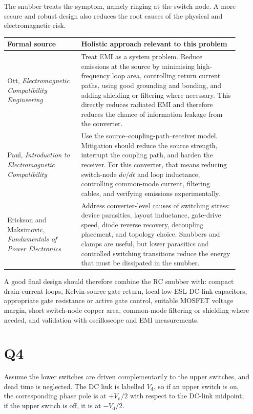 \documentclass[11pt,a4paper]{article}
\newcommand{\Vd}{V_{\mathrm d}}
\begin{document}
The snubber treats the symptom, namely ringing at the switch node. A more secure and robust design also reduces the root causes of the physical and electromagnetic risk.

\begin{longtable}{@{}p{0.30\linewidth}p{0.64\linewidth}@{}}
\toprule
Formal source & Holistic approach relevant to this problem \\
\midrule
Ott, \emph{Electromagnetic Compatibility Engineering} \cite{ott} & Treat EMI as a system problem. Reduce emissions at the source by minimising high-frequency loop area, controlling return current paths, using good grounding and bonding, and adding shielding or filtering where necessary. This directly reduces radiated EMI and therefore reduces the chance of information leakage from the converter. \\
Paul, \emph{Introduction to Electromagnetic Compatibility} \cite{paul} & Use the source--coupling-path--receiver model. Mitigation should reduce the source strength, interrupt the coupling path, and harden the receiver. For this converter, that means reducing switch-node $dv/dt$ and loop inductance, controlling common-mode current, filtering cables, and verifying emissions experimentally. \\
Erickson and Maksimovic, \emph{Fundamentals of Power Electronics} \cite{erickson} & Address converter-level causes of switching stress: device parasitics, layout inductance, gate-drive speed, diode reverse recovery, decoupling placement, and topology choice. Snubbers and clamps are useful, but lower parasitics and controlled switching transitions reduce the energy that must be dissipated in the snubber. \\
\bottomrule
\end{longtable}

A good final design should therefore combine the RC snubber with: compact drain-current loops, Kelvin-source gate return, local low-ESL DC-link capacitors, appropriate gate resistance or active gate control, suitable MOSFET voltage margin, short switch-node copper area, common-mode filtering or shielding where needed, and validation with oscilloscope and EMI measurements.

\newpage
\section*{Q4}

Assume the lower switches are driven complementarily to the upper switches, and dead time is neglected. The DC link is labelled $\Vd$, so if an upper switch is on, the corresponding phase pole is at $+\Vd/2$ with respect to the DC-link midpoint; if the upper switch is off, it is at $-\Vd/2$.
\end{document}
